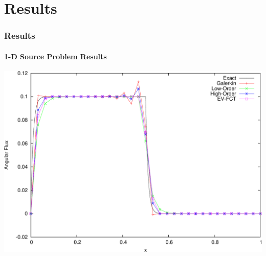 \documentclass{beamer}
\begin{document}
\section{Results}
\begin{frame}
\frametitle{Results}
\framesubtitle{1-D Source Problem Results}

\includegraphics[width=\textwidth]{./figures/solutions_source_FE.pdf}

\end{frame}
\end{document}
